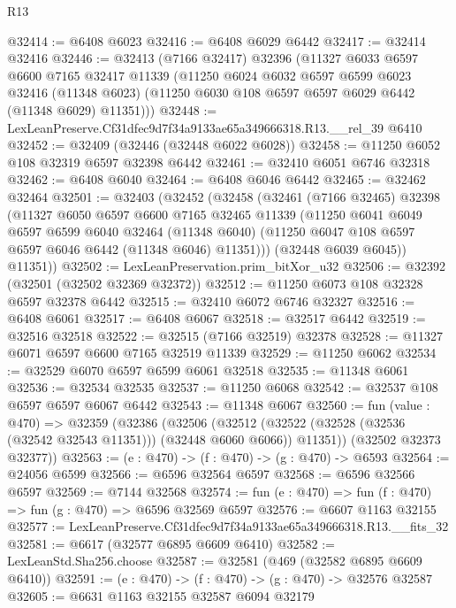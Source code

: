 \begin{lexlean}{R13}
\begin{coremodule}
@32414 := @6408 @6023
@32416 := @6408 @6029 @6442
@32417 := @32414 @32416
@32446 := @32413
    (@7166 @32417)
    @32396
    (@11327
      @6033
      @6597
      @6600
      @7165
      @32417
      @11339
      (@11250
        @6024
        @6032
        @6597
        @6599
        @6023
        @32416
        (@11348 @6023)
        (@11250 @6030 @108 @6597 @6597 @6029 @6442 (@11348 @6029) @11351)))
@32448 := LexLeanPreserve.Cf31dfec9d7f34a9133ae65a349666318.R13.__rel_39 @6410
@32452 := @32409 (@32446 (@32448 @6022 @6028))
@32458 := @11250 @6052 @108 @32319 @6597 @32398 @6442
@32461 := @32410 @6051 @6746 @32318
@32462 := @6408 @6040
@32464 := @6408 @6046 @6442
@32465 := @32462 @32464
@32501 := @32403
    (@32452
      (@32458
        (@32461
          (@7166 @32465)
          @32398
          (@11327
            @6050
            @6597
            @6600
            @7165
            @32465
            @11339
            (@11250
              @6041
              @6049
              @6597
              @6599
              @6040
              @32464
              (@11348 @6040)
              (@11250 @6047 @108 @6597 @6597 @6046 @6442 (@11348 @6046) @11351)))
          (@32448 @6039 @6045))
        @11351))
@32502 := LexLeanPreservation.prim_bitXor_u32
@32506 := @32392 (@32501 (@32502 @32369 @32372))
@32512 := @11250 @6073 @108 @32328 @6597 @32378 @6442
@32515 := @32410 @6072 @6746 @32327
@32516 := @6408 @6061
@32517 := @6408 @6067
@32518 := @32517 @6442
@32519 := @32516 @32518
@32522 := @32515 (@7166 @32519) @32378
@32528 := @11327 @6071 @6597 @6600 @7165 @32519 @11339
@32529 := @11250 @6062
@32534 := @32529 @6070 @6597 @6599 @6061 @32518
@32535 := @11348 @6061
@32536 := @32534 @32535
@32537 := @11250 @6068
@32542 := @32537 @108 @6597 @6597 @6067 @6442
@32543 := @11348 @6067
@32560 := fun (value : @470) =>
  @32359
    (@32386
      (@32506
        (@32512 (@32522 (@32528 (@32536 (@32542 @32543 @11351))) (@32448 @6060 @6066)) @11351))
      (@32502 @32373 @32377))
@32563 := (e : @470) -> (f : @470) -> (g : @470) -> @6593
@32564 := @24056 @6599
@32566 := @6596 @32564 @6597
@32568 := @6596 @32566 @6597
@32569 := @7144 @32568
@32574 := fun (e : @470) => fun (f : @470) => fun (g : @470) => @6596 @32569 @6597
@32576 := @6607 @1163 @32155
@32577 := LexLeanPreserve.Cf31dfec9d7f34a9133ae65a349666318.R13.__fits_32
@32581 := @6617 (@32577 @6895 @6609 @6410)
@32582 := LexLeanStd.Sha256.choose
@32587 := @32581 (@469 (@32582 @6895 @6609 @6410))
@32591 := (e : @470) -> (f : @470) -> (g : @470) -> @32576 @32587
@32605 := @6631
    @1163
    @32155
    @32587
    @6094
    @32179

\end{coremodule}
\end{lexlean}
